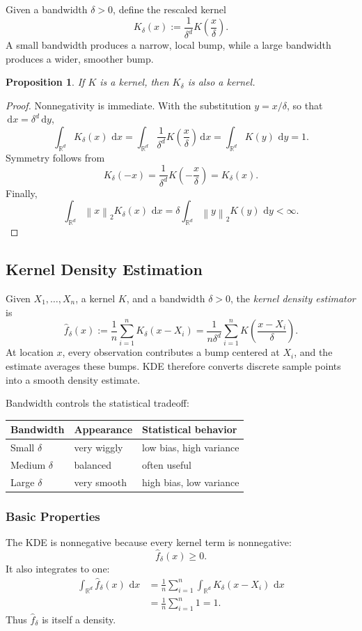 \documentclass[12pt,oneside]{book}
\numberwithin{equation}{section}
\theoremstyle{definition}
\theoremstyle{plain}
\newtheorem{proposition}{Proposition}[section]
\theoremstyle{remark}
\newcommand{\R}{\mathbb{R}}
\newcommand{\norm}[1]{\left\lVert #1 \right\rVert}
\newcommand{\dd}{\,\mathrm{d}}
\begin{document}
Given a bandwidth $\delta>0$, define the rescaled kernel
\[
K_\delta(x):=\frac{1}{\delta^d}K\left(\frac{x}{\delta}\right).
\]
A small bandwidth produces a narrow, local bump, while a large bandwidth produces a wider, smoother bump.

\begin{proposition}
If $K$ is a kernel, then $K_\delta$ is also a kernel.
\end{proposition}

\begin{proof}
Nonnegativity is immediate. With the substitution $y=x/\delta$, so that $\dd x=\delta^d\dd y$,
\[
\int_{\R^d}K_\delta(x)\,\dd x
=\int_{\R^d}\frac{1}{\delta^d}
K\left(\frac{x}{\delta}\right)\dd x
=\int_{\R^d}K(y)\,\dd y=1.
\]
Symmetry follows from
\[
K_\delta(-x)
=\frac{1}{\delta^d}K\left(-\frac{x}{\delta}\right)
=K_\delta(x).
\]
Finally,
\[
\int_{\R^d}\norm{x}_2K_\delta(x)\,\dd x
=\delta\int_{\R^d}\norm{y}_2K(y)\,\dd y<\infty.
\]
\end{proof}

\subsection{Kernel Density Estimation}
Given $X_1,\ldots,X_n$, a kernel $K$, and a bandwidth $\delta>0$, the \emph{kernel density estimator} is
\[
\widehat f_\delta(x)
:=\frac{1}{n}\sum_{i=1}^nK_\delta(x-X_i)
=\frac{1}{n\delta^d}\sum_{i=1}^n
K\left(\frac{x-X_i}{\delta}\right).
\]
At location $x$, every observation contributes a bump centered at $X_i$, and the estimate averages these bumps. KDE therefore converts discrete sample points into a smooth density estimate.

Bandwidth controls the statistical tradeoff:
\begin{center}
\begin{tabular}{@{}lll@{}}
\toprule
\textbf{Bandwidth} & \textbf{Appearance} & \textbf{Statistical behavior}\\
\midrule
Small $\delta$ & very wiggly & low bias, high variance\\
Medium $\delta$ & balanced & often useful\\
Large $\delta$ & very smooth & high bias, low variance\\
\bottomrule
\end{tabular}
\end{center}

\subsubsection{Basic Properties}
The KDE is nonnegative because every kernel term is nonnegative:
\[
\widehat f_\delta(x)\geq0.
\]
It also integrates to one:
\begin{align*}
\int_{\R^d}\widehat f_\delta(x)\,\dd x
&=\frac{1}{n}\sum_{i=1}^n
\int_{\R^d}K_\delta(x-X_i)\,\dd x\\
&=\frac{1}{n}\sum_{i=1}^n1=1.
\end{align*}
Thus $\widehat f_\delta$ is itself a density.
\end{document}
